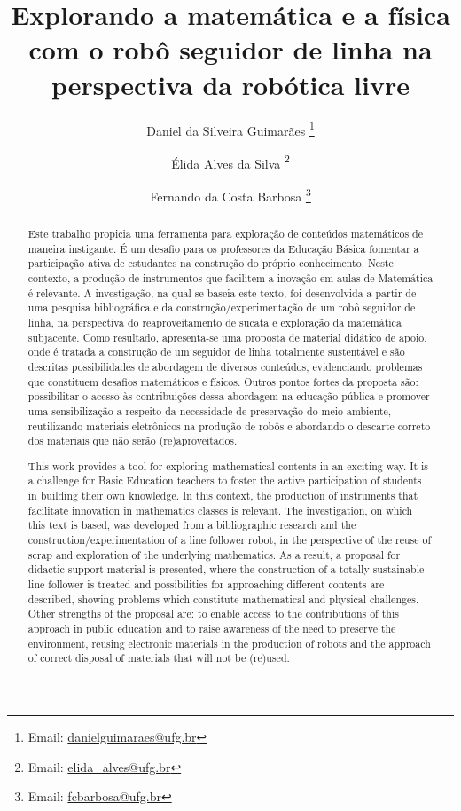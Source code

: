 \documentclass{textolivre}
\title{Explorando a matemática e a física com o robô seguidor de linha na perspectiva da robótica livre}
\author[1]{Daniel da Silveira Guimarães \orcid{0000-0003-1973-9609} \thanks{Email: \url{danielguimaraes@ufg.br}}}
\author[1]{Élida Alves da Silva \orcid{0000-0001-5417-9083} \thanks{Email: \url{elida_alves@ufg.br}}}
\author[1]{Fernando da Costa Barbosa \orcid{0000-0001-8558-3521} \thanks{Email: \url{fcbarbosa@ufg.br}}}
\affil[1]{Universidade Federal de Goiás, Brasil.}
\begin{document}
\maketitle

\begin{polyabstract}
\begin{abstract}
Este trabalho propicia uma ferramenta para exploração de conteúdos matemáticos 
de maneira instigante. É um desafio para os professores da Educação Básica
fomentar a participação ativa de estudantes na construção do próprio
conhecimento. Neste contexto, a produção de instrumentos que facilitem a
inovação em aulas de Matemática é relevante. A investigação, na qual se baseia
este texto, foi desenvolvida a partir de uma pesquisa bibliográfica e da
construção/experimentação de um robô seguidor de linha, na perspectiva do
reaproveitamento de sucata e exploração da matemática subjacente. Como
resultado, apresenta-se uma proposta de material didático de apoio, onde é
tratada a construção de um seguidor de linha totalmente sustentável e são
descritas possibilidades de abordagem de diversos conteúdos, evidenciando
problemas que constituem desafios matemáticos e físicos. Outros pontos fortes
da proposta são: possibilitar o acesso às contribuições dessa abordagem na
educação pública e promover uma sensibilização a respeito da necessidade de
preservação do meio ambiente, reutilizando materiais eletrônicos na produção de
robôs e abordando o descarte correto dos materiais que não serão
(re)aproveitados.

\end{abstract}

\begin{english}
\begin{abstract}
This work provides a tool for exploring mathematical contents in an exciting
way. It is a challenge for Basic Education teachers to foster the active
participation of students in building their own knowledge. In this context, the
production of instruments that facilitate innovation in mathematics classes is
relevant. The investigation, on which this text is based, was developed from a
bibliographic research and the construction/experimentation of a line follower
robot, in the perspective of the reuse of scrap and exploration of the
underlying mathematics. As a result, a proposal for didactic support material
is presented, where the construction of a totally sustainable line follower is
treated and possibilities for approaching different contents are described,
showing problems which constitute mathematical and physical challenges. Other
strengths of the proposal are: to enable access to the contributions of this
approach in public education and to raise awareness of the need to preserve the
environment, reusing electronic materials in the production of robots and the
approach of correct disposal of materials that will not be (re)used.


\end{abstract}
\end{english}
\end{polyabstract}
\end{document}
